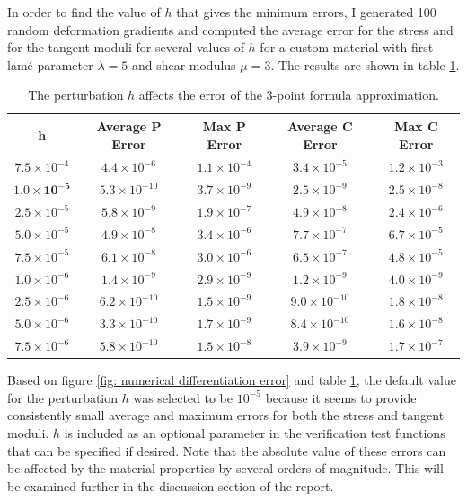 \documentclass[]{spie}  %
\newcommand\Tstrut{\rule{0pt}{2.6ex}}         %
\begin{document}
In order to find the value of $h$ that gives the minimum errors, I generated 100 random deformation gradients and computed the average error for the stress and for the tangent moduli for several values of $h$ for a custom material with first lam\'e parameter $\lambda = 5$ and shear modulus $\mu = 3$. The results are shown in table \ref{table: h vs. error}.

\begin{table}[h]
	\centering
	\caption{The perturbation $h$ affects the error of the 3-point formula approximation.}
	\begin{tabular}{ | c | c | c | c | c | }
		\hline
		h & Average P Error & Max P Error & Average C Error & Max C Error \Tstrut \\ \hline
		$7.5 \times 10^{-4}$ & $4.4 \times 10^{-6}$  & $1.1 \times 10^{-4}$ & $3.4 \times 10^{-5}$ & $1.2 \times 10^{-3}$ \Tstrut \\
		$\bm{1.0 \times 10^{-5}}$ & $5.3 \times 10^{-10}$ & $3.7 \times 10^{-9}$ & $2.5 \times 10^{-9}$ & $2.5 \times 10^{-8}$ \\
		$2.5 \times 10^{-5}$ & $5.8 \times 10^{-9}$  & $1.9 \times 10^{-7}$ & $4.9 \times 10^{-8}$ & $2.4 \times 10^{-6}$ \\
		$5.0 \times 10^{-5}$ & $4.9 \times 10^{-8}$  & $3.4 \times 10^{-6}$ & $7.7 \times 10^{-7}$ & $6.7 \times 10^{-5}$ \\
		$7.5 \times 10^{-5}$ & $6.1 \times 10^{-8}$  & $3.0 \times 10^{-6}$ & $6.5 \times 10^{-7}$ & $4.8 \times 10^{-5}$ \\
		$1.0 \times 10^{-6}$ & $1.4 \times 10^{-9}$  & $2.9 \times 10^{-9}$ & $1.2 \times 10^{-9}$ & $4.0 \times 10^{-9}$ \\
		$2.5 \times 10^{-6}$ & $6.2 \times 10^{-10}$ & $1.5 \times 10^{-9}$ & $9.0 \times 10^{-10}$& $1.8 \times 10^{-8}$ \\
		$5.0 \times 10^{-6}$ & $3.3 \times 10^{-10}$ & $1.7 \times 10^{-9}$ & $8.4 \times 10^{-10}$& $1.6 \times 10^{-8}$ \\
		$7.5 \times 10^{-6}$ & $5.8 \times 10^{-10}$ & $1.5 \times 10^{-8}$ & $3.9 \times 10^{-9}$ & $1.7 \times 10^{-7}$ \\
		\hline
	\end{tabular}
\label{table: h vs. error}
\end{table}

Based on figure \ref{fig: numerical differentiation error} and table \ref{table: h vs. error}, the default value for the perturbation $h$ was selected to be $10^{-5}$ because it seems to provide consistently small average and maximum errors for both the stress and tangent moduli. $h$ is included as an optional parameter in the verification test functions that can be specified if desired. Note that the absolute value of these errors can be affected by the material properties by several orders of magnitude. This will be examined further in the discussion section of the report.
\end{document}
